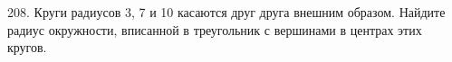 208. Круги радиусов 3, 7 и 10 касаются друг друга внешним образом. Найдите радиус окружности, вписанной в треугольник с вершинами в центрах этих кругов.\\
